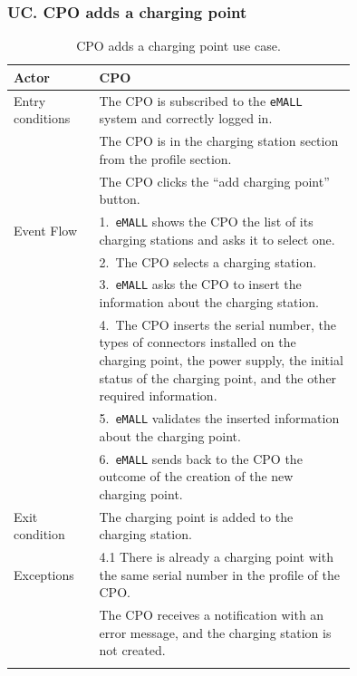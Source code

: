 \subsubsection*{UC\cuc . CPO adds a charging point}
\begin{center}
    \begin{longtable}{lp{0.75\linewidth}}
        \hline
        Actor            & CPO                                                                                             \\
        \hline
        Entry conditions & The CPO is subscribed to the \verb|eMALL| system and correctly logged in.                       \\
        & The CPO is in the charging station section from the profile section.                            \\
        & The CPO clicks the “add charging point” button.                                                 \\
        \hline
        Event Flow       & 1.\ \verb|eMALL| shows the CPO the list of its charging stations and asks it to select one.     \\
        & 2.\ The CPO selects a charging station.                                                         \\
        & 3.\ \verb|eMALL| asks the CPO to insert the information about the charging station.             \\
        & 4.\ The CPO inserts the serial number, the types of connectors installed on the charging point, the power supply,
        the initial status of the charging point, and the other required information. \\
        & 5.\ \verb|eMALL| validates the inserted information about the charging point.                   \\
        & 6.\ \verb|eMALL| sends back to the CPO the outcome of the creation of the new charging point.   \\
        \hline
        Exit condition   & The charging point is added to the charging station.                                            \\
        \hline
        Exceptions       & 4.1 There is already a charging point with the same serial number in the profile of the CPO.    \\
        & The CPO receives a notification with an error message, and the charging station is not created. \\
        \hline
        \caption{CPO adds a charging point use case.}
        \label{tab: CPO_adds_charging_point_use_case}
    \end{longtable}


\end{center}
